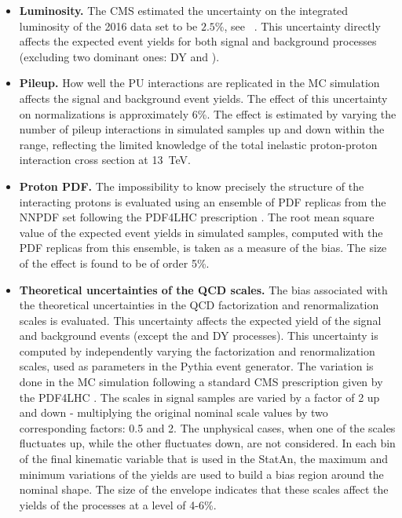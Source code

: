 \begin{itemize}

\item{\bf Luminosity.} 
The CMS estimated the uncertainty on the integrated luminosity of the 2016 data set to be $2.5\%$, see ~\cite{CMS-PAS-LUM-17-001}. This uncertainty directly affects the expected event yields for both signal and background processes (excluding two dominant ones: DY and \ttbar).

\item{\bf Pileup.} 
How well the PU interactions are replicated in the MC simulation affects the signal and background event yields. The effect of this uncertainty on normalizations is approximately 6\%. The effect is estimated by varying the number of pileup interactions in simulated samples up and down within the range, reflecting the limited knowledge of the total inelastic proton-proton interaction cross section at 13~TeV. 

\item{\bf Proton PDF.} 
The impossibility to know precisely the structure of the interacting protons is evaluated using an ensemble of PDF replicas from the NNPDF set \cite{Ball:2014uwa} following the PDF4LHC prescription \cite{Botje:2011sn,Alekhin:2011sk}. The root mean square value of the expected event yields in simulated samples, computed with the PDF replicas from this ensemble, is taken as a measure of the bias. The size of the effect is found to be of order 5\%. 

\item{\bf Theoretical uncertainties of the QCD scales.} 
The bias associated with the theoretical uncertainties in the QCD factorization and renormalization scales is evaluated. This uncertainty affects the expected yield of the signal and background events (except the \ttbar and DY processes). This uncertainty is computed by independently varying the factorization and renormalization scales, used as parameters in the Pythia event generator. The variation is done in the MC simulation following a standard CMS prescription given by the PDF4LHC \cite{Butterworth:2015oua}. The scales in signal samples are varied by a factor of 2 up and down - multiplying the original nominal scale values by two corresponding factors: 0.5 and 2. The unphysical cases, when one of the scales fluctuates up, while the other fluctuates down, are not considered. In each bin of the final kinematic variable that is used in the StatAn, the maximum and minimum variations of the yields are used to build a bias region around the nominal shape. The size of the envelope indicates that these scales affect the yields of the processes at a level of 4-6\%.


\end{itemize}
